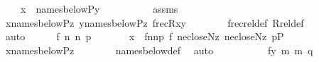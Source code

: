\begin{isabellebody}
\ \ \ \ {\isachardoublequoteopen}x\ {\isasymin}\ names{\isacharunderscore}{\kern0pt}below{\isacharparenleft}{\kern0pt}P{\isacharcomma}{\kern0pt}y{\isacharparenright}{\kern0pt}{\isachardoublequoteclose}\isanewline
%
\isadelimproof
%
\endisadelimproof
%
\isatagproof
{}\isamarkupfalse%
\ {\isacharminus}{\kern0pt}\isanewline
\ \ \isacommand{{\isacharbraceleft}{\kern0pt}}\isamarkupfalse%
\isanewline
\ \ \ \ \isamarkupfalse%
\ assms\isanewline
\ \ \ \ \isamarkupfalse%
\ {\isachardoublequoteopen}x{\isasymin}names{\isacharunderscore}{\kern0pt}below{\isacharparenleft}{\kern0pt}P{\isacharcomma}{\kern0pt}z{\isacharparenright}{\kern0pt}{\isachardoublequoteclose}\ {\isachardoublequoteopen}y{\isasymin}names{\isacharunderscore}{\kern0pt}below{\isacharparenleft}{\kern0pt}P{\isacharcomma}{\kern0pt}z{\isacharparenright}{\kern0pt}{\isachardoublequoteclose}\ {\isachardoublequoteopen}frecR{\isacharparenleft}{\kern0pt}x{\isacharcomma}{\kern0pt}y{\isacharparenright}{\kern0pt}{\isachardoublequoteclose}\isanewline
\ \ \ \ \ \ \isamarkupfalse%
\ frecrel{\isacharunderscore}{\kern0pt}def\ Rrel{\isacharunderscore}{\kern0pt}def\isanewline
\ \ \ \ \ \ \isamarkupfalse%
\ auto\isanewline
\ \ \ \ \isamarkupfalse%
\ f\ n{}\ n{}\ p\ \isanewline
\ \ \ \ \ \ {\isachardoublequoteopen}x\ {\isacharequal}{\kern0pt}\ {\isasymlangle}f{\isacharcomma}{\kern0pt}n{}{\isacharcomma}{\kern0pt}n{}{\isacharcomma}{\kern0pt}p{\isasymrangle}{\isachardoublequoteclose}\ {\isachardoublequoteopen}f{\isasymin}{}{\isachardoublequoteclose}\ {\isachardoublequoteopen}n{}{\isasymin}ecloseN{\isacharparenleft}{\kern0pt}z{\isacharparenright}{\kern0pt}{\isachardoublequoteclose}\ {\isachardoublequoteopen}n{}{\isasymin}ecloseN{\isacharparenleft}{\kern0pt}z{\isacharparenright}{\kern0pt}{\isachardoublequoteclose}\ {\isachardoublequoteopen}p{\isasymin}P{\isachardoublequoteclose}\isanewline
\ \ \ \ \ \ \isamarkupfalse%
\ {\isacartoucheopen}x{\isasymin}names{\isacharunderscore}{\kern0pt}below{\isacharparenleft}{\kern0pt}P{\isacharcomma}{\kern0pt}z{\isacharparenright}{\kern0pt}{\isacartoucheclose}\isanewline
\ \ \ \ \ \ \isamarkupfalse%
\ names{\isacharunderscore}{\kern0pt}below{\isacharunderscore}{\kern0pt}def\ \isamarkupfalse%
\ auto\isanewline
\ \ \ \ \isamarkupfalse%
\isanewline
\ \ \ \ \isamarkupfalse%
\ fy\ m{}\ m{}\ q\ \isanewline

\end{isabellebody}

